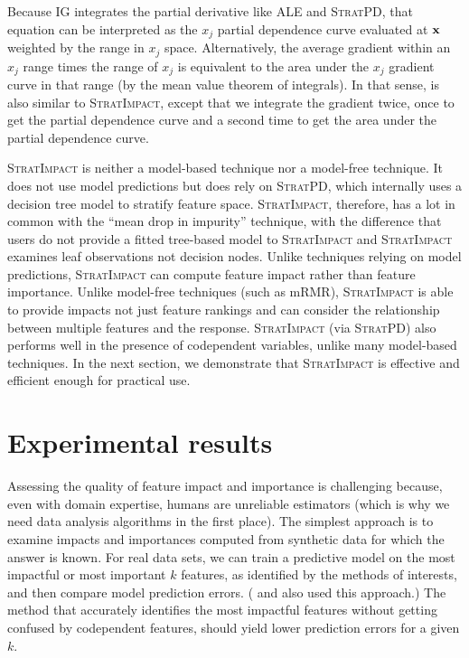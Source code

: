 \documentclass[11pt]{article}
\newcommand{\simp}{\fontfamily{cmr}\textsc{\small StratImpact}}
\newcommand{\spd}{\fontfamily{cmr}\textsc{\small StratPD}}
\begin{document}
\noindent  Because IG integrates the partial derivative like ALE and \spd, that equation can be interpreted as the $x_j$ partial dependence curve evaluated at $\bf x$ weighted by the range in $x_j$ space. Alternatively, the average gradient within an $x_j$ range times the range of $x_j$ is equivalent to the area under the $x_j$ gradient curve in that range (by the mean value theorem of integrals). In that sense, \cite{intgrad} is also similar to \simp, except that we integrate the gradient twice, once to get the partial dependence curve and a second time to get the area under the partial dependence curve.

\simp{} is neither a model-based technique nor a model-free technique. It does not use model predictions but does rely on \spd, which internally uses a decision tree model to stratify feature space. \simp{}, therefore, has a lot in common with the ``mean drop in impurity'' technique, with the difference that users do not provide a fitted tree-based model to \simp{} and \simp{} examines leaf observations not decision nodes. Unlike techniques relying on model predictions, \simp{} can compute feature impact rather than feature importance. Unlike model-free techniques (such as mRMR), \simp{} is able to provide impacts not just feature rankings and can consider the relationship between multiple features and the response.   \simp{} (via \spd) also performs well in the presence of codependent variables, unlike many model-based techniques. In the next section, we demonstrate that \simp{} is effective and efficient enough for practical use.

\section{Experimental results}\label{sec:experiments}

Assessing the quality of feature impact and importance is challenging because, even with domain expertise, humans are unreliable estimators (which is why we need data analysis algorithms in the first place).  The simplest approach is to examine impacts and importances computed from synthetic data for which the answer is known.  For real data sets, we can train a predictive model on the most impactful or most important $k$ features, as identified by the methods of interests, and then compare model prediction errors. (\citealt{mRMR} and \citealt{tsanas} also used this approach.) The method that accurately identifies the most impactful features without getting confused by codependent features, should yield lower prediction errors for a given $k$.  
\end{document}
